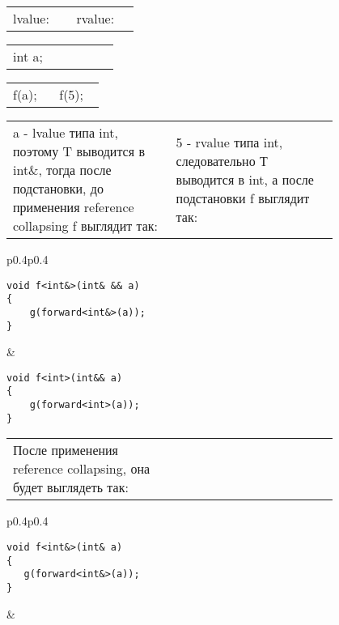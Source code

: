 \begin{center}
\begin{tabular}{p{0.4\linewidth}p{0.4\linewidth}}
lvalue: & rvalue:\\
\end{tabular}

\begin{tabular}{p{0.4\linewidth}p{0.4\linewidth}}
int a; & \vspace{\baselineskip}\\
\end{tabular}

\begin{tabular}{p{0.4\linewidth}p{0.4\linewidth}}
f(a); & f(5);\\
\end{tabular}

\begin{tabular}{p{0.4\linewidth}p{0.4\linewidth}}
a - lvalue типа int, поэтому T выводится в int\&, тогда после подстановки, до применения reference collapsing f выглядит так: & 5 - rvalue типа int, следовательно Т выводится в int, а после подстановки f выглядит так:\\
\end{tabular}

\begin{tabular}{p{0.4\linewidth}p{0.4\linewidth}}
\begin{verbatim}
void f<int&>(int& && a)
{
    g(forward<int&>(a));
}
\end{verbatim}
&
\begin{verbatim}
void f<int>(int&& a)
{
    g(forward<int>(a));
}
\end{verbatim}
\end{tabular}

\begin{tabular}{p{0.4\linewidth}p{0.4\linewidth}}
После применения reference collapsing, она будет выглядеть так:
& \vspace{\baselineskip}\\
\end{tabular}

\begin{tabular}{p{0.4\linewidth}p{0.4\linewidth}}
\begin{verbatim}
void f<int&>(int& a)
{
   g(forward<int&>(a));
}
\end{verbatim}
& \vspace{\baselineskip}\\
\end{tabular}


\end{center}
